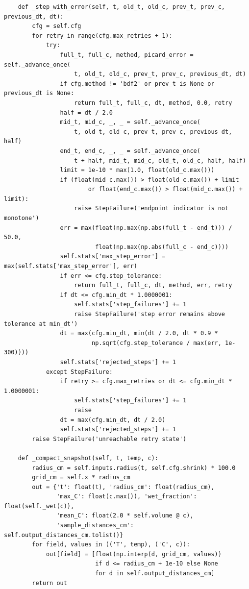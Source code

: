 \begin{verbatim}
    def _step_with_error(self, t, old_t, old_c, prev_t, prev_c, previous_dt, dt):
        cfg = self.cfg
        for retry in range(cfg.max_retries + 1):
            try:
                full_t, full_c, method, picard_error = self._advance_once(
                    t, old_t, old_c, prev_t, prev_c, previous_dt, dt)
                if cfg.method != 'bdf2' or prev_t is None or previous_dt is None:
                    return full_t, full_c, dt, method, 0.0, retry
                half = dt / 2.0
                mid_t, mid_c, _, _ = self._advance_once(
                    t, old_t, old_c, prev_t, prev_c, previous_dt, half)
                end_t, end_c, _, _ = self._advance_once(
                    t + half, mid_t, mid_c, old_t, old_c, half, half)
                limit = 1e-10 * max(1.0, float(old_c.max()))
                if (float(mid_c.max()) > float(old_c.max()) + limit
                        or float(end_c.max()) > float(mid_c.max()) + limit):
                    raise StepFailure('endpoint indicator is not monotone')
                err = max(float(np.max(np.abs(full_t - end_t))) / 50.0,
                          float(np.max(np.abs(full_c - end_c))))
                self.stats['max_step_error'] = max(self.stats['max_step_error'], err)
                if err <= cfg.step_tolerance:
                    return full_t, full_c, dt, method, err, retry
                if dt <= cfg.min_dt * 1.0000001:
                    self.stats['step_failures'] += 1
                    raise StepFailure('step error remains above tolerance at min_dt')
                dt = max(cfg.min_dt, min(dt / 2.0, dt * 0.9 *
                         np.sqrt(cfg.step_tolerance / max(err, 1e-300))))
                self.stats['rejected_steps'] += 1
            except StepFailure:
                if retry >= cfg.max_retries or dt <= cfg.min_dt * 1.0000001:
                    self.stats['step_failures'] += 1
                    raise
                dt = max(cfg.min_dt, dt / 2.0)
                self.stats['rejected_steps'] += 1
        raise StepFailure('unreachable retry state')

    def _compact_snapshot(self, t, temp, c):
        radius_cm = self.inputs.radius(t, self.cfg.shrink) * 100.0
        grid_cm = self.x * radius_cm
        out = {'t': float(t), 'radius_cm': float(radius_cm),
               'max_C': float(c.max()), 'wet_fraction': float(self._wet(c)),
               'mean_C': float(2.0 * self.volume @ c),
               'sample_distances_cm': self.output_distances_cm.tolist()}
        for field, values in (('T', temp), ('C', c)):
            out[field] = [float(np.interp(d, grid_cm, values))
                          if d <= radius_cm + 1e-10 else None
                          for d in self.output_distances_cm]
        return out


\end{verbatim}
